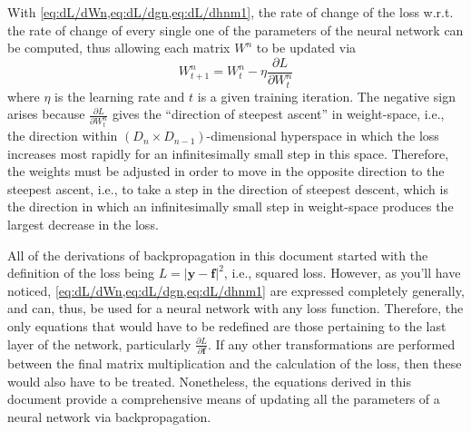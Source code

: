\documentclass{article}
\begin{document}
\vspace{1em}
With \cref{eq:dL/dWn,eq:dL/dgn,eq:dL/dhnm1}, the rate of change of the loss w.r.t. the rate of change of every single one of the parameters of the neural network can be computed, thus allowing each matrix $W^n$ to be updated via
\begin{equation}
    W^n_{t+1} = W^n_t - \eta\frac{\partial L}{\partial W^n_t}
\end{equation}
where $\eta$ is the learning rate and $t$ is a given training iteration. The negative sign arises because $\frac{\partial L}{\partial W^n_t}$ gives the ``direction of steepest ascent'' in weight-space, i.e., the direction within $(D_n \times D_{n-1})$-dimensional hyperspace in which the loss increases most rapidly for an infinitesimally small step in this space. Therefore, the weights must be adjusted in order to move in the opposite direction to the steepest ascent, i.e., to take a step in the direction of steepest descent, which is the direction in which an infinitesimally small step in weight-space produces the largest decrease in the loss.

\vspace{1em}
All of the derivations of backpropagation in this document started with the definition of the loss being $L = \left|\mathbf{y} - \mathbf{f}\right|^2$, i.e., squared loss. However, as you'll have noticed, \cref{eq:dL/dWn,eq:dL/dgn,eq:dL/dhnm1} are expressed completely generally, and can, thus, be used for a neural network with any loss function. Therefore, the only equations that would have to be redefined are those pertaining to the last layer of the network, particularly $\frac{\partial L}{\partial \mathbf{f}}$. If any other transformations are performed between the final matrix multiplication and the calculation of the loss, then these would also have to be treated. Nonetheless, the equations derived in this document provide a comprehensive means of updating all the parameters of a neural network via backpropagation.
\end{document}

